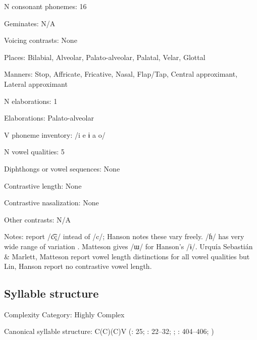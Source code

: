 {\begin{appendixdesc}
\item[N consonant phonemes:] 16

\item[Geminates:] N/A

\item[Voicing contrasts:] None

\item[Places:] Bilabial, Alveolar, Palato-alveolar, Palatal, Velar, Glottal

\item[Manners:] Stop, Affricate, Fricative, Nasal, Flap/Tap, Central approximant, Lateral approximant

\item[N elaborations:] 1

\item[Elaborations:] Palato-alveolar

\item[V phoneme inventory:] /i e ɨ a o/

\item[N vowel qualities:] 5

\item[Diphthongs or vowel sequences:] None

\item[Contrastive length:] None

\item[Contrastive nasalization:] None

\item[Other contrasts:] N/A

\item[Notes:]  \citet{UrquíaSebastiánMarlett2008} report /c͡ç/ intead of /c/; Hanson notes these vary freely. /ɦ/ has very wide range of variation \citep[20--23]{Hanson2010}. Matteson gives /ɯ/ for Hanson’s /ɨ/. Urquía Sebastián \& Marlett, Matteson report vowel length distinctions for all vowel qualities but Lin, Hanson report no contrastive vowel length.
\end{appendixdesc}
\subsection*{Syllable structure}
\begin{appendixdesc}

\item[Complexity Category:] Highly Complex

\item[Canonical syllable structure:] C(C)(C)V (\citealt{Hanson2010}: 25; \citealt{Matteson1965}: 22--32; \citealt{MattesonPike1958}; \citealt{Lin1997}: 404--406; \citealt{Lin1993})


\end{appendixdesc}}
